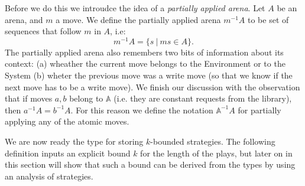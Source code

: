 \documentclass[10pt,a4paper]{amsart}
\numberwithin{equation}{section}
\theoremstyle{plain}
\newcommand{\atoms}{\mathbb A}
\begin{document}
Before we do this we introudce the idea of a \emph{partially applied arena}.
Let $A$ be an arena, and $m$ a move. We define the partially applied arena ${m^{-1}}A$ 
to be set of sequences that follow $m$ in $A$, i.e:
\[m^{-1}A = \{s \ | \ ms \in A \}.\]
The partially applied arena also remembers two bits of information about its context: (a) wheather the current move belongs to the Environment or to the System
(b) wheter the previous move was a write move (so that we know if the next move has to be a write move). We finish our discussion with the observation 
that if moves $a, b$ belong to $\atoms$ (i.e. they are constant requests from the library), then $a^{-1}A = b^{-1}A$. 
For this reason we define the notation $\atoms^{-1}A$ for partially applying any of the atomic moves. 


We are now ready the type for storing $k$-bounded strategies.  The following definition inputs an explicit bound $k$ for the length of the plays, but later on in this section will show that such a bound can be derived from the types by using an analysis of strategies.
\end{document}

